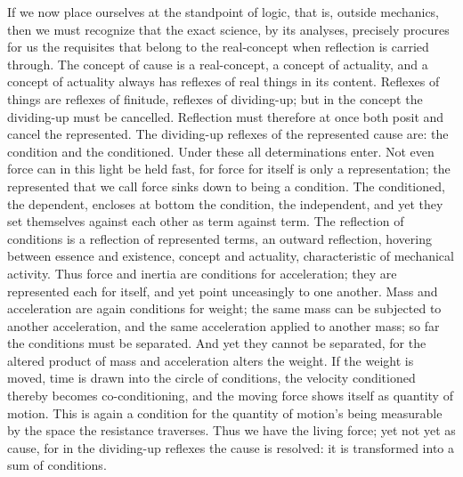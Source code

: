 \documentclass[12pt]{book}
\begin{document}
If we now place ourselves at the standpoint of logic, that is, outside mechanics,
then we must recognize that the exact science, by its analyses, precisely procures
for us the requisites that belong to the real-concept when reflection is carried
through. The concept of cause is a real-concept, a concept of actuality, and a
concept of actuality always has reflexes of real things in its content. Reflexes of
things are reflexes of finitude, reflexes of dividing-up; but in the concept the
dividing-up must be cancelled. Reflection must therefore at once both posit and
cancel the represented. The dividing-up reflexes of the represented cause are: the
condition and the conditioned. Under these all determinations enter. Not even force
can in this light be held fast, for force for itself is only a representation; the
represented that we call force sinks down to being a condition. The conditioned, the
dependent, encloses at bottom the condition, the independent, and yet they set
themselves against each other as term against term. The reflection of conditions is
a reflection of represented terms, an outward reflection, hovering between essence
and existence, concept and actuality, characteristic of mechanical activity. Thus
force and inertia are conditions for acceleration; they are represented each for
itself, and yet point unceasingly to one another. Mass and acceleration are again
conditions for weight; the same mass can be subjected to another acceleration, and
the same acceleration applied to another mass; so far the conditions must be
separated. And yet they cannot be separated, for the altered product of mass and
acceleration alters the weight. If the weight is moved, time is drawn into the
circle of conditions, the velocity conditioned thereby becomes co-conditioning, and
the moving force shows itself as quantity of motion. This is again a condition for
the quantity of motion's being measurable by the space the resistance traverses.
Thus we have the living force; yet not yet as cause, for in the dividing-up reflexes
the cause is resolved: it is transformed into a sum of conditions.
\end{document}
